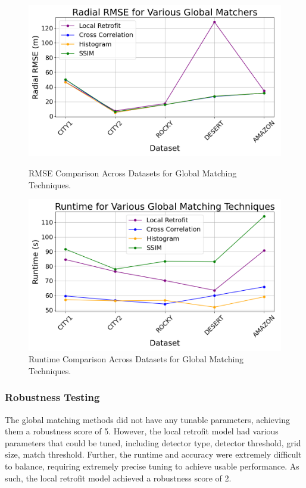 \begin{figure}[H]
    \centering
    \begin{minipage}{0.45\textwidth}
        \centering
        \includegraphics[width=\textwidth]{./Chapter 4/testresults/rmse_global_matching.png}
        \caption{RMSE Comparison Across Datasets for Global Matching Techniques.}
        \label{fig:rmse_global_matching}
    \end{minipage}\hfill
    \begin{minipage}{0.45\textwidth}
        \centering
        \includegraphics[width=\textwidth]{./Chapter 4/testresults/runtime_global_matching.png}
        \caption{Runtime Comparison Across Datasets for Global Matching Techniques.}
        \label{fig:runtime_global_matching}
    \end{minipage}
\end{figure}

\subsubsection*{Robustness Testing}
The global matching methods did not have any tunable parameters, achieving them a robustness score of 5. However, the local retrofit model had various parameters that could be tuned, including detector type, detector threshold, grid size, match threshold. Further, the runtime and accuracy were extremely difficult to balance, requiring extremely precise tuning to achieve usable performance. As such, the local retrofit model achieved a robustness score of 2. 


